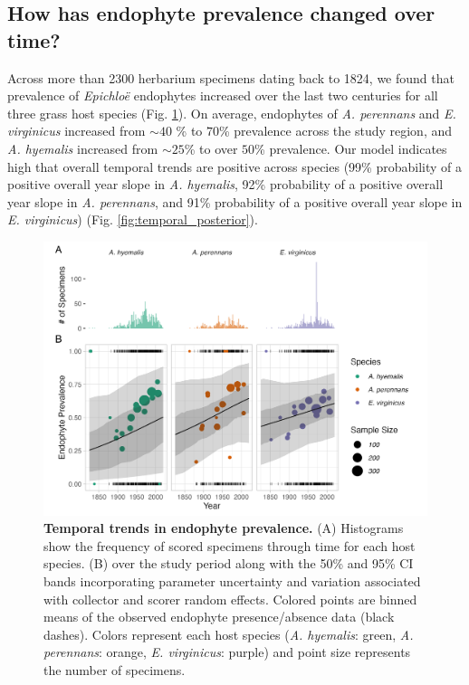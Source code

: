 \documentclass[11pt]{article}
\newcommand{\firstrevise}[1]{{\color{black}{#1}}}
\begin{document}
\subsection*{How has endophyte prevalence changed over time?}
Across more than 2300 herbarium specimens dating back to 1824, we found that prevalence of \emph{Epichloë} endophytes increased over the last two centuries for all three grass host species (Fig. \ref{fig:temporal}). 
On average, endophytes of \emph{A. perennans} and \emph{E. virginicus} increased from $\sim 40$ \% to  $70$\% prevalence across the study region, and \emph{A. hyemalis} increased from $\sim 25$\% to over $50$\% prevalence.
Our model indicates high \firstrevise{confidence} that overall temporal trends are positive across species (99\% probability of a positive overall year slope in \emph{A. hyemalis}, 92\% probability of a positive overall year slope in \emph{A. perennans}, and 91\% probability of a positive overall year slope in \emph{E. virginicus}) (Fig. \ref{fig:temporal_posterior}). 

\begin{figure}[H]
	\centering
	\includegraphics[width = \linewidth]{../Plots/year_plot.png}
	\caption[Temporal trends in endophyte prevalence.]{\textbf{Temporal trends in endophyte prevalence.} (A) Histograms show the frequency of scored specimens through time for each host species. (B)\firstrevise{ Lines show mean endophyte prevalence predicted by the endophyte prevalence model} over the study period along with the 50\%  and 95\% CI bands incorporating parameter uncertainty and variation associated with collector and scorer random effects. Colored points are binned means of the observed endophyte presence/absence data (black dashes). Colors represent each host species (\emph{A. hyemalis}: green, \emph{A. perennans}: orange, \emph{E. virginicus}: purple) and point size represents the number of specimens.}
	\label{fig:temporal}
\end{figure}
\end{document}
